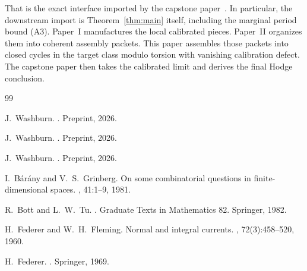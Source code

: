 \documentclass[11pt]{article}
\numberwithin{equation}{section}
\theoremstyle{plain}
\theoremstyle{definition}
\theoremstyle{remark}
\begin{document}
That is the exact interface imported by the capstone paper~\cite{Washburn26IV}.  In particular, the downstream import is Theorem~\ref{thm:main} itself, including the marginal period bound \textnormal{(A3)}.  Paper~I manufactures the local calibrated pieces.  Paper~II organizes them into coherent assembly packets.  This paper assembles those packets into closed cycles in the target class modulo torsion with vanishing calibration defect.  The capstone paper then takes the calibrated limit and derives the final Hodge conclusion.

\begin{thebibliography}{99}

J.~Washburn.
.
\newblock Preprint, 2026.

J.~Washburn.
.
\newblock Preprint, 2026.

J.~Washburn.
.
\newblock Preprint, 2026.

I.~B\'ar\'any and V.~S.~Grinberg.
\newblock On some combinatorial questions in finite-dimensional spaces.
, 41:1--9, 1981.

R.~Bott and L.~W.~Tu.
.
\newblock Graduate Texts in Mathematics 82. Springer, 1982.

H.~Federer and W.~H.~Fleming.
\newblock Normal and integral currents.
, 72(3):458--520, 1960.

H.~Federer.
.
\newblock Springer, 1969.

\end{thebibliography}
\end{document}
